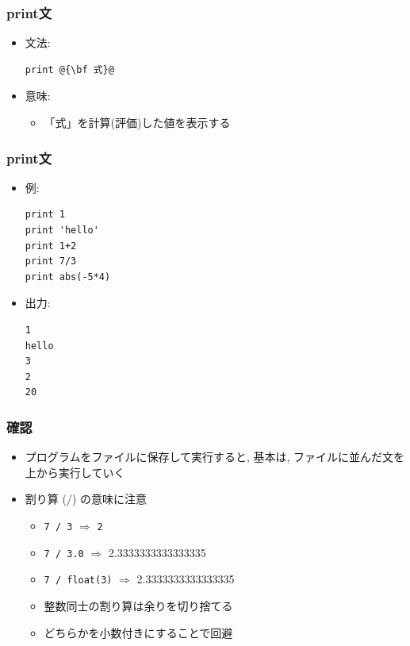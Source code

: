 \documentclass[10pt,dvipdfmx]{beamer}
\newcommand{\ao}[1]{{\color{blue}#1}}
\newcommand{\aka}[1]{{\color{red}#1}}
\begin{document}
\begin{frame}[fragile]
\frametitle{print文}
\begin{itemize}
\item 文法:
\begin{lstlisting}
print @{\bf 式}@
\end{lstlisting}
\item 意味:
  \begin{itemize}
  \item 「式」を計算(評価)した値を表示する
  \end{itemize}
\end{itemize}
\end{frame}

\begin{frame}[fragile]
\frametitle{print文}
\begin{itemize}
\item 例:
\begin{lstlisting}
print 1
print 'hello'
print 1+2
print 7/3
print abs(-5*4)
\end{lstlisting}
\item<2> 出力:
\begin{lstlisting}
1
hello
3
2
20
\end{lstlisting}
\end{itemize}
\end{frame}

\begin{frame}
\frametitle{確認}
\begin{itemize}
\item プログラムをファイルに保存して実行すると, 
基本は, \ao{ファイルに並んだ文を上から実行}していく

\item 割り算 (/) の意味に注意
  \begin{itemize}
  \item {\tt 7 / 3} $\Rightarrow$ \aka{\tt 2}
  \item {\tt 7 / 3.0} $\Rightarrow$ \aka{2.3333333333333335}
  \item {\tt 7 / float(3)} $\Rightarrow$ \aka{2.3333333333333335}
  \item 整数同士の割り算は余りを切り捨てる
  \item どちらかを小数付きにすることで回避
  \end{itemize}
\end{itemize}
\end{frame}

\end{document}
